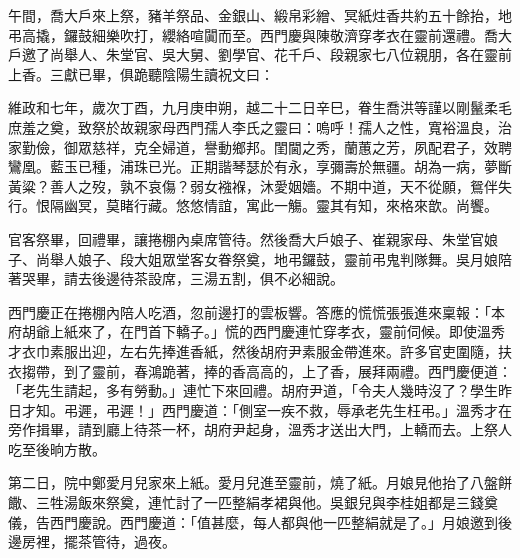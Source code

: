 午間，喬大戶來上祭，豬羊祭品、金銀山、緞帛彩繒、冥紙炷香共約五十餘抬，地弔高撬，鑼鼓細樂吹打，纓絡喧闐而至。西門慶與陳敬濟穿孝衣在靈前還禮。喬大戶邀了尚舉人、朱堂官、吳大舅、劉學官、花千戶、段親家七八位親朋，各在靈前上香。三獻已畢，俱跪聽陰陽生讀祝文曰：

維政和七年，歲次丁酉，九月庚申朔，越二十二日辛巳，眷生喬洪等謹以剛鬣柔毛庶羞之奠，致祭於故親家母西門孺人李氏之靈曰：嗚呼！孺人之性，寬裕溫良，治家勤儉，御眾慈祥，克全婦道，譽動鄉邦。閨閫之秀，蘭蕙之芳，夙配君子，效聘鸞凰。藍玉已種，浦珠已光。正期諧琴瑟於有永，享彌壽於無疆。胡為一病，夢斷黃粱？善人之歿，孰不哀傷？弱女襁褓，沐愛姻嬙。不期中道，天不從願，鴛伴失行。恨隔幽冥，莫睹行藏。悠悠情誼，寓此一觴。靈其有知，來格來歆。尚饗。

官客祭畢，回禮畢，讓捲棚內桌席管待。然後喬大戶娘子、崔親家母、朱堂官娘子、尚舉人娘子、段大姐眾堂客女眷祭奠，地弔鑼鼓，靈前弔鬼判隊舞。吳月娘陪著哭畢，請去後邊待茶設席，三湯五割，俱不必細說。

西門慶正在捲棚內陪人吃酒，忽前邊打的雲板響。答應的慌慌張張進來稟報：「本府胡爺上紙來了，在門首下轎子。」慌的西門慶連忙穿孝衣，靈前伺候。即使溫秀才衣巾素服出迎，左右先捧進香紙，然後胡府尹素服金帶進來。許多官吏圍隨，扶衣搊帶，到了靈前，春鴻跪著，捧的香高高的，上了香，展拜兩禮。西門慶便道： 「老先生請起，多有勞動。」連忙下來回禮。胡府尹道，「令夫人幾時沒了？學生昨日才知。弔遲，弔遲！」西門慶道：「側室一疾不救，辱承老先生枉弔。」溫秀才在旁作揖畢，請到廳上待茶一杯，胡府尹起身，溫秀才送出大門，上轎而去。上祭人吃至後晌方散。

第二日，院中鄭愛月兒家來上紙。愛月兒進至靈前，燒了紙。月娘見他抬了八盤餅饊、三牲湯飯來祭奠，連忙討了一匹整絹孝裙與他。吳銀兒與李桂姐都是三錢奠儀，告西門慶說。西門慶道：「值甚麼，每人都與他一匹整絹就是了。」月娘邀到後邊房裡，擺茶管待，過夜。

